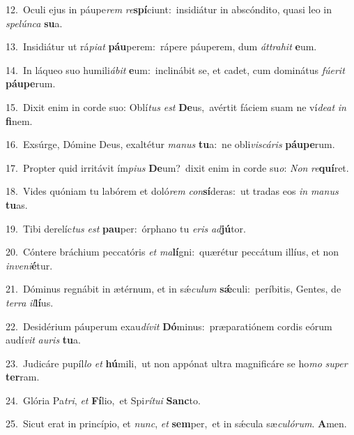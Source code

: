 {\numbfont\textcolor{\numbcolor}{12.}}~Oculi ejus in páupe\textit{rem} \textit{re}\-\textbf{spí}ciunt:~\star insidiátur in abscóndito, quasi leo in \textit{spe}\-\textit{lún}\textit{ca} \textbf{su}\-a.\par
{\numbfont\textcolor{\numbcolor}{13.}}~Insidiátur ut rá\-\textit{pi}\-\textit{at} \textbf{páu}\-perem:~\star rápere páuperem, dum \textit{át}\-\textit{tra}\textit{hit} \textbf{e}\-um.\par
{\numbfont\textcolor{\numbcolor}{14.}}~In láqueo suo humili\-\textit{á}\-\textit{bit} \textbf{e}\-um:~\star inclinábit se, et cadet, cum dominátus \textit{fú}\-\textit{e}\textit{rit} \textbf{páu}\-\textbf{pe}rum.\par
{\numbfont\textcolor{\numbcolor}{15.}}~Dixit enim in corde suo: Oblí\textit{tus} \textit{est} \textbf{De}\-us,~\star avértit fáciem suam ne ví\-\textit{de}\-\textit{at} \textit{in} \textbf{fi}\-nem.\par
{\numbfont\textcolor{\numbcolor}{16.}}~Exsúrge, Dómine Deus, exaltétur \textit{ma}\-\textit{nus} \textbf{tu}\-a:~\star ne obli\-\textit{vis}\-\textit{cá}\textit{ris} \textbf{páu}\-\textbf{pe}rum.\par
{\numbfont\textcolor{\numbcolor}{17.}}~Propter quid irritávit ím\-\textit{pi}\-\textit{us} \textbf{De}\-um?~\star dixit enim in corde su\-\textit{o}\-: \textit{Non} \textit{re}\-\textbf{quí}ret.\par
{\numbfont\textcolor{\numbcolor}{18.}}~Vides quóniam tu labórem et doló\textit{rem} \textit{con}\-\textbf{sí}deras:~\star ut tradas eos \textit{in} \textit{ma}\-\textit{nus} \textbf{tu}\-as.\par
{\numbfont\textcolor{\numbcolor}{19.}}~Tibi derelíc\textit{tus} \textit{est} \textbf{pau}\-per:~\star órphano tu \textit{e}\-\textit{ris} \textit{ad}\-\textbf{jú}tor.\par
{\numbfont\textcolor{\numbcolor}{20.}}~Cóntere bráchium peccatóris \textit{et} \textit{ma}\-\textbf{lí}gni:~\star quærétur peccátum illíus, et non \textit{in}\-\textit{ve}\textit{ni}\textbf{é}tur.\par
{\numbfont\textcolor{\numbcolor}{21.}}~Dóminus regnábit in ætérnum, et in sǽ\-\textit{cu}\-\textit{lum} \textbf{sǽ}\-culi:~\star períbitis, Gentes, de \textit{ter}\-\textit{ra} \textit{il}\-\textbf{lí}us.\par
{\numbfont\textcolor{\numbcolor}{22.}}~Desidérium páuperum exau\-\textit{dí}\-\textit{vit} \textbf{Dó}\-minus:~\star præparatiónem cordis eórum audí\textit{vit} \textit{au}\-\textit{ris} \textbf{tu}\-a.\par
{\numbfont\textcolor{\numbcolor}{23.}}~Judicáre pupíl\textit{lo} \textit{et} \textbf{hú}\-mili,~\star ut non appónat ultra magnificáre se ho\textit{mo} \textit{su}\-\textit{per} \textbf{ter}\-ram.\par
{\numbfont\textcolor{\numbcolor}{24.}}~Glória Pa\-\textit{tri}\-, \textit{et} \textbf{Fí}\-lio,~\star et Spi\-\textit{rí}\-\textit{tu}\textit{i} \textbf{Sanc}\-to.\par
{\numbfont\textcolor{\numbcolor}{25.}}~Sicut erat in princípio, et \textit{nunc}\-, \textit{et} \textbf{sem}\-per,~\star et in sǽcula sæ\-\textit{cu}\-\textit{ló}\textit{rum}. \textbf{A}\-men.\par
